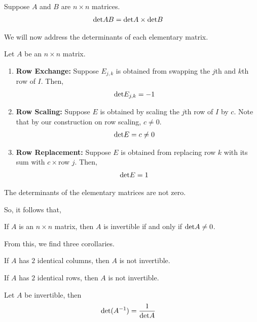 \begin{lemma}
    Suppose $A$ and $B$ are $n \times n$ matrices.
    \begin{align*}
        \text{det} AB &= \text{det} A \times \text{det} B
    \end{align*}
\end{lemma}

We will now address the determinants of each elementary matrix.
\begin{lemma}
    Let $A$ be an $n \times n$ matrix.
    \begin{enumerate}
        \item[] \textbf{Row Exchange:} Suppose $E_{j, k}$ is obtained from swapping the $j$th and $k$th row of $I$. Then,
        \begin{align*}
            \text{det} E_{j,k} &= -1
        \end{align*}
        \item[] \textbf{Row Scaling:} Suppose $E$ is obtained by scaling the $j$th row of $I$ by $c$. Note that by our construction on row scaling,
        $c \neq 0$.
        \begin{align*}
            \text{det} E &= c \neq 0
        \end{align*}
        \item[] \textbf{Row Replacement:} Suppose $E$ is obtained from replacing row $k$ with its sum with $c \times$row $j$. Then,
        \begin{align*}
            \text{det} E &= 1
        \end{align*}
    \end{enumerate}
\end{lemma} 

\begin{corollary}
    The determinants of the elementary matrices are not zero.
\end{corollary}

So, it follows that,
\begin{thm}
    If $A$ is an $n \times n$ matrix, then $A$ is invertible if and only if $\text{det} A \neq 0$.
\end{thm}

From this, we find three corollaries.
\begin{corollary}
    If $A$ has $2$ identical columns, then $A$ is not invertible.
\end{corollary}
\begin{corollary}
    If $A$ has $2$ identical rows, then $A$ is not invertible.
\end{corollary}

\begin{corollary}
    Let $A$ be invertible, then
    \begin{align*}
        \text{det}({A^{-1}}) &= \frac{1}{\text{det} A}
    \end{align*}
\end{corollary}
